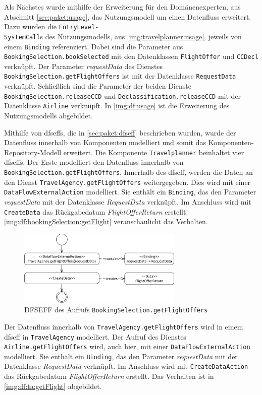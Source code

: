 Als Nächstes wurde mithilfe der Erweiterung für den Domänenexperten, aus Abschnitt \ref{sec:paket:usage}, das Nutzungsmodell um einen Datenfluss erweitert. Dazu wurden die \texttt{EntryLevel-\\SystemCall}s des Nutzungsmodells, aus \autoref{img:travelplanner:usage}, jeweils von einem \texttt{Binding} referenziert. Dabei sind die Parameter aus \texttt{BookingSelection.bookSelected} mit den Datenklassen \texttt{FlightOffer} und \texttt{CCDecl} verknüpft. Der Parameter \textit{requestData} des Dienstes \texttt{BookingSelection.getFlightOffers} ist mit der Datenklasse \texttt{RequestData} verknüpft. Schließlich sind die Parameter der beiden Dienste \texttt{BookingSelection.releaseCCD} und \texttt{Declassification.releaseCCD} mit der Datenklasse \texttt{Airline} verknüpft. In \autoref{img:df:usage} ist die Erweiterung des Nutzungsmodells abgebildet. \par
Mithilfe von \gls{dfseff}s, die in \autoref{sec:paket:dfseff} beschrieben wurden, wurde der Datenfluss innerhalb von Komponenten modelliert und somit das Komponenten-Repository-Modell erweitert. Die Komponente \texttt{Travelplanner} beinhaltet vier \gls{dfseff}s. Der Erste modelliert den Datenfluss innerhalb von \texttt{BookingSelection.getFlightOffers}. Innerhalb des \gls{dfseff}, werden die Daten an den Dienst \texttt{TravelAgency.getFlightOffers} weitergegeben. Dies wird mit einer \texttt{DataFlowExternalAction} modelliert. Sie enthält ein \texttt{Binding}, das den Parameter \textit{requestData} mit der Datenklasse \textit{RequestData} verknüpft. Im Anschluss wird mit \texttt{CreateData} das Rückgabedatum \textit{FlightOfferReturn} erstellt. \autoref{img:df:bookingSelection:getFlight} veranschaulicht das Verhalten. \par
\begin{figure}[h]
	\centering
  	\includegraphics[width=0.7\textwidth]{images/dfseff_bookingSelection_getFlight.png}
	\caption{DFSEFF des Aufrufs \texttt{BookingSelection.getFlightOffers}}
	\label{img:df:bookingSelection:getFlight}
\end{figure}
Der Datenfluss innerhalb von \texttt{TravelAgency.getFlightOffers} wird in einem \gls{dfseff} in \texttt{TravelAgency} modelliert. Der Aufruf des Dienstes \texttt{Airline.getFlightOffers} wird, auch hier, mit einer \texttt{DataFlowExternalAction} modelliert. Sie enthält ein \texttt{Binding}, das den Parameter \textit{requestData} mit der Datenklasse \textit{RequestData} verknüpft. Im Anschluss wird mit \texttt{CreateDataAction} das Rückgabedatum \textit{FlightOfferReturn} erstellt. Das Verhalten ist in \autoref{img:df:ta:getFlight} abgebildet. \par
